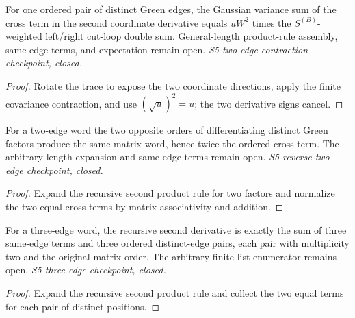 \begin{lemma}
  \label{lem:loop-contraction-second}
  \leanok
  For one ordered pair of distinct Green edges, the Gaussian variance sum
  of the cross term in the second coordinate derivative equals $uW^2$ times
  the $S^{(B)}$-weighted left/right cut-loop double sum. General-length
  product-rule assembly, same-edge terms, and expectation remain open.
  \emph{S5 two-edge contraction checkpoint, closed.}
\end{lemma}
\begin{proof}\leanok
  Rotate the trace to expose the two coordinate directions, apply the finite
  covariance contraction, and use $(\sqrt u)^2=u$; the two derivative signs
  cancel.
\end{proof}

\begin{lemma}
  \label{lem:loop-contraction-second-reverse}
  \leanok
  For a two-edge word the two opposite orders of differentiating distinct
  Green factors produce the same matrix word, hence twice the ordered cross
  term. The arbitrary-length expansion and same-edge terms remain open.
  \emph{S5 reverse two-edge checkpoint, closed.}
\end{lemma}
\begin{proof}\leanok
  Expand the recursive second product rule for two factors and normalize the
  two equal cross terms by matrix associativity and addition.
\end{proof}

\begin{lemma}
  \label{lem:loop-contraction-three-edges}
  \leanok
  For a three-edge word, the recursive second derivative is exactly the
  sum of three same-edge terms and three ordered distinct-edge pairs, each
  pair with multiplicity two and the original matrix order. The arbitrary
  finite-list enumerator remains open. \emph{S5 three-edge checkpoint, closed.}
\end{lemma}
\begin{proof}\leanok
  Expand the recursive second product rule and collect the two equal terms
  for each pair of distinct positions.
\end{proof}

